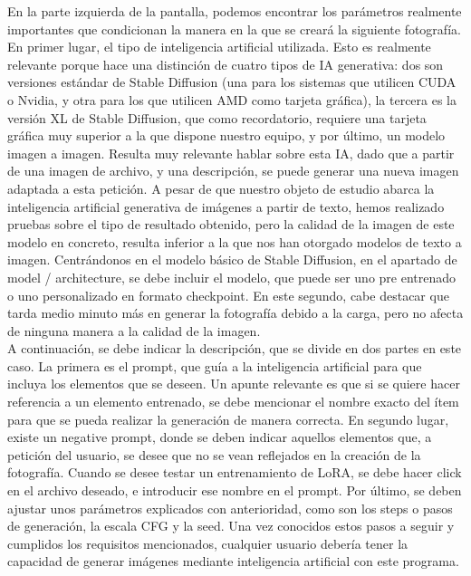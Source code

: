  En la parte izquierda de la pantalla, podemos encontrar los parámetros realmente importantes que condicionan la manera en la que se creará la siguiente fotografía. En primer lugar, el tipo de inteligencia artificial utilizada. Esto es realmente relevante porque hace una distinción de cuatro tipos de IA generativa: dos son versiones estándar de Stable Diffusion (una para los sistemas que utilicen CUDA o Nvidia, y otra para los que utilicen AMD como tarjeta gráfica), la tercera es la versión XL de Stable Diffusion, que como recordatorio, requiere una tarjeta gráfica muy superior a la que dispone nuestro equipo, y por último, un modelo imagen a imagen. Resulta muy relevante hablar sobre esta IA, dado que a partir de una imagen de archivo, y una descripción, se puede generar una nueva imagen adaptada a esta petición. A pesar de que nuestro objeto de estudio abarca la inteligencia artificial generativa de imágenes a partir de texto, hemos realizado pruebas sobre el tipo de resultado obtenido, pero la calidad de la imagen de este modelo en concreto, resulta inferior a la que nos han otorgado modelos de texto a imagen. Centrándonos en el modelo básico de Stable Diffusion, en el apartado de model / architecture, se debe incluir el modelo, que puede ser uno pre entrenado o uno personalizado en formato checkpoint. En este segundo, cabe destacar que tarda medio minuto más en generar la fotografía debido a la carga, pero no afecta de ninguna manera a la calidad de la imagen. \\
 
 A continuación, se debe indicar la descripción, que se divide en dos partes en este caso. La primera es el prompt, que guía a la inteligencia artificial para que incluya los elementos que se deseen. Un apunte relevante es que si se quiere hacer referencia a un elemento entrenado, se debe mencionar el nombre exacto del ítem para que se pueda realizar la generación de manera correcta. En segundo lugar, existe un negative prompt, donde se deben indicar aquellos elementos que, a petición del usuario, se desee que no se vean reflejados en la creación de la fotografía. Cuando se desee testar un entrenamiento de LoRA, se debe hacer click en el archivo deseado, e introducir ese nombre en el prompt. Por último, se deben ajustar unos parámetros explicados con anterioridad, como son los steps o pasos de generación, la escala CFG y la seed. Una vez conocidos estos pasos a seguir y cumplidos los requisitos mencionados, cualquier usuario debería tener la capacidad de generar imágenes mediante inteligencia artificial con este programa.\\

